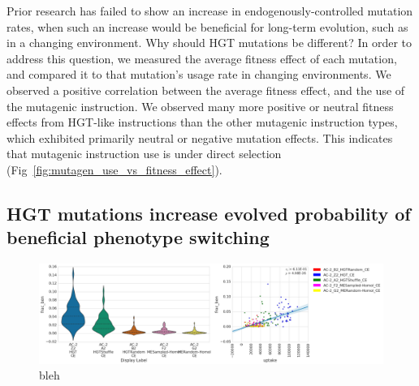 \documentclass[PhD]{msu-thesis}
\begin{document}
Prior research has failed to show an increase in endogenously-controlled mutation rates, when such an increase would be beneficial for long-term evolution, such as in a changing environment\cite{clune_natural_2008}.
Why should HGT mutations be different? In order to address this question, we measured the average fitness effect of each mutation, and compared it to that mutation's usage rate in changing environments. We observed a positive correlation between the average fitness effect, and the use of the mutagenic instruction. We observed many more positive or neutral fitness effects from HGT-like instructions than the other mutagenic instruction types, which exhibited primarily neutral or negative mutation effects. This indicates that mutagenic instruction use is under direct selection (Fig~\ref{fig:mutagen_use_vs_fitness_effect}).




\subsection{HGT mutations increase evolved probability of beneficial phenotype switching}
\begin{figure}[h!]
\begin{center}
\includegraphics[width=0.7\columnwidth]{figures/HGT/mutagen_use_vs_fraction_beneficial.png}
\caption{bleh
}\label{fig:mutagen_use_vs_fraction_beneficial}
\end{center}
\end{figure}
\end{document}
